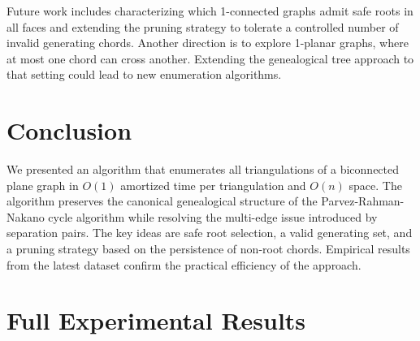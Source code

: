 \documentclass[12pt,a4paper]{report}
\theoremstyle{definition}
\theoremstyle{remark}
\begin{document}
Future work includes characterizing which 1-connected graphs admit safe roots in all
faces and extending the pruning strategy to tolerate a controlled number of invalid
generating chords. Another direction is to explore 1-planar graphs, where at most one
chord can cross another. Extending the genealogical tree approach to that setting could
lead to new enumeration algorithms.

\chapter{Conclusion}
\label{chap:conclusion}

We presented an algorithm that enumerates all triangulations of a biconnected plane graph
in $O(1)$ amortized time per triangulation and $O(n)$ space. The algorithm preserves the
canonical genealogical structure of the Parvez-Rahman-Nakano cycle algorithm while
resolving the multi-edge issue introduced by separation pairs. The key ideas are safe root
selection, a valid generating set, and a pruning strategy based on the persistence of
non-root chords. Empirical results from the latest dataset confirm the practical
efficiency of the approach.

\appendix
\chapter{Full Experimental Results}
\label{app:full_results}

\small



\end{document}
